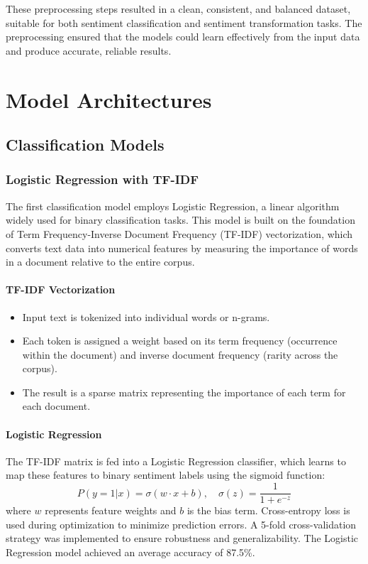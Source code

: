 \documentclass{article}
\begin{document}
These preprocessing steps resulted in a clean, consistent, and balanced dataset, suitable for both sentiment classification and sentiment transformation tasks. The preprocessing ensured that the models could learn effectively from the input data and produce accurate, reliable results.



\section{Model Architectures}

\subsection{Classification Models}

\subsubsection{Logistic Regression with TF-IDF}
The first classification model employs Logistic Regression, a linear algorithm widely used for binary classification tasks. This model is built on the foundation of Term Frequency-Inverse Document Frequency (TF-IDF) vectorization, which converts text data into numerical features by measuring the importance of words in a document relative to the entire corpus.

\paragraph{TF-IDF Vectorization}
\begin{itemize}
    \item Input text is tokenized into individual words or n-grams.
    \item Each token is assigned a weight based on its term frequency (occurrence within the document) and inverse document frequency (rarity across the corpus).
    \item The result is a sparse matrix representing the importance of each term for each document.
\end{itemize}

\paragraph{Logistic Regression}
The TF-IDF matrix is fed into a Logistic Regression classifier, which learns to map these features to binary sentiment labels using the sigmoid function:
\[
P(y=1|x) = \sigma(w \cdot x + b), \quad \sigma(z) = \frac{1}{1 + e^{-z}}
\]
where \(w\) represents feature weights and \(b\) is the bias term. Cross-entropy loss is used during optimization to minimize prediction errors. A 5-fold cross-validation strategy was implemented to ensure robustness and generalizability. The Logistic Regression model achieved an average accuracy of 87.5\%.
\end{document}
